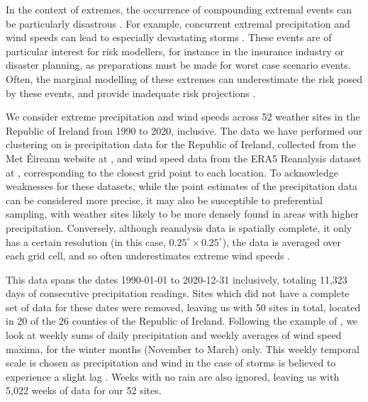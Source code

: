 \documentclass{article}
\numberwithin{equation}{section}
\begin{document}
In the context of extremes, the occurrence of compounding extremal events can be particularly disastrous \citep{Vignotto2021, Leonard2014}.
For example, concurrent extremal precipitation and wind speeds can lead to especially devastating storms \citep{Martius2016}.
These events are of particular interest for risk modellers, for instance in the insurance industry or disaster planning, as preparations must be made for worst case scenario events.
Often, the marginal modelling of these extremes can underestimate the risk posed by these events, and provide inadequate risk projections \citep{Zscheischler2017}.

We consider extreme precipitation and wind speeds across 52 weather sites in the Republic of Ireland from 1990 to 2020, inclusive.  
The data we have performed our clustering on is precipitation data for the Republic of Ireland, collected from the Met Éireann website at \citet{metHistoricalData}, and wind speed data from the ERA5 Reanalysis dataset at \citet{Hersbach2020}, corresponding to the closest grid point to each location.
To acknowledge weaknesses for these datasets, while the point estimates of the precipitation data can be considered more precise, it may also be susceptible to preferential sampling, with weather sites likely to be more densely found in areas with higher precipitation.
Conversely, although reanalysis data is spatially complete, it only has a certain resolution (in this case, $0.25^{\circ} \times 0.25^{\circ}$), the data is averaged over each grid cell, and so often underestimates extreme wind speeds \citep{Gandoin2024}.

This data spans the dates 1990-01-01 to 2020-12-31 inclusively, totaling 11,323 days of consecutive precipitation readings. 
Sites which did not have a complete set of data for these dates were removed, leaving us with 50 sites in total, located in 20 of the 26 counties of the Republic of Ireland. 
Following the example of \citet{Vignotto2021}, we look at weekly sums of daily precipitation and weekly averages of wind speed maxima, for the winter months (November to March) only.
This weekly temporal scale is chosen as precipitation and wind in the case of storms is believed to experience a slight lag \citep{Bengtsson2009}.
Weeks with no rain are also ignored, leaving us with 5,022 weeks of data for our 52 sites.
\end{document}
